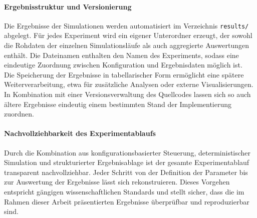 \documentclass[12pt,a4paper]{article}
\begin{document}
\paragraph{Ergebnisstruktur und Versionierung}
Die Ergebnisse der Simulationen werden automatisiert im Verzeichnis
\texttt{results/} abgelegt. Für jedes Experiment wird ein eigener Unterordner
erzeugt, der sowohl die Rohdaten der einzelnen Simulationsläufe als auch
aggregierte Auswertungen enthält. Die Dateinamen enthalten den Namen des
Experiments, sodass eine eindeutige Zuordnung zwischen Konfiguration und
Ergebnisdaten möglich ist.\\
Die Speicherung der Ergebnisse in tabellarischer Form ermöglicht eine spätere
Weiterverarbeitung, etwa für zusätzliche Analysen oder externe
Visualisierungen. In Kombination mit einer Versionsverwaltung des Quellcodes
lassen sich so auch ältere Ergebnisse eindeutig einem bestimmten Stand der
Implementierung zuordnen.

\paragraph{Nachvollziehbarkeit des Experimentablaufs}
Durch die Kombination aus konfigurationsbasierter Steuerung, deterministischer
Simulation und strukturierter Ergebnisablage ist der gesamte Experimentablauf
transparent nachvollziehbar. Jeder Schritt von der Definition der Parameter
bis zur Auswertung der Ergebnisse lässt sich rekonstruieren. Dieses Vorgehen
entspricht gängigen wissenschaftlichen Standards und stellt sicher, dass die
im Rahmen dieser Arbeit präsentierten Ergebnisse überprüfbar und
reproduzierbar sind.
\end{document}
